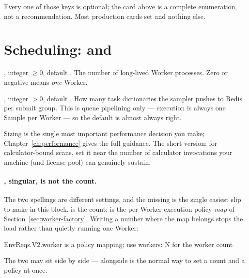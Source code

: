 Every one of those keys is optional; the card above is a complete enumeration, not a
recommendation. Most production cards set  and nothing else.

\section{Scheduling:  and }
\label{sec:workers}

\begin{keylist}
  \item[workers] \opt, integer $\geq 0$, default . The number of long-lived
        Worker processes. Zero or negative means \emph{one} Worker.
  \item[batch\_size] \opt, integer $> 0$, default . How many task
        dictionaries the sampler pushes to Redis per submit group. This is queue
        pipelining only --- execution is always one Sample per Worker --- so the default
        is almost always right.
\end{keylist}

Sizing  is the single most important performance decision you make;
Chapter~\ref{ch:performance} gives the full guidance. The short version: for
calculator-bound scans, set it near the number of calculator invocations your machine (and
license pool) can genuinely sustain.

\paragraph{, singular, is not the count.} The two spellings are
different settings, and the missing  is the single easiest slip to make in this
block.  is the count;  is the per-Worker execution
policy \emph{map} of Section~\ref{sec:worker-factory}. Writing a number where the map
belongs stops the load rather than quietly running one Worker:

\begin{terminal}
\begin{jout}
EnvReqs.V2.worker is a policy mapping; use workers: N for the worker count
\end{jout}
\end{terminal}

The two may sit side by side ---  alongside
 is the normal way to set a count and a policy at once.

